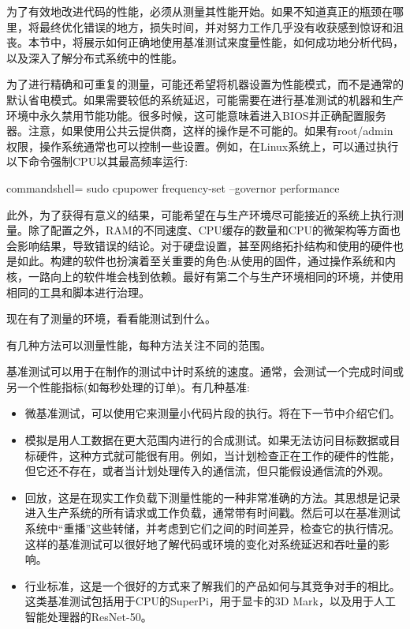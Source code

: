 

为了有效地改进代码的性能，必须从测量其性能开始。如果不知道真正的瓶颈在哪里，将最终优化错误的地方，损失时间，并对努力工作几乎没有收获感到惊讶和沮丧。本节中，将展示如何正确地使用基准测试来度量性能，如何成功地分析代码，以及深入了解分布式系统中的性能。


为了进行精确和可重复的测量，可能还希望将机器设置为性能模式，而不是通常的默认省电模式。如果需要较低的系统延迟，可能需要在进行基准测试的机器和生产环境中永久禁用节能功能。很多时候，这可能意味着进入BIOS并正确配置服务器。注意，如果使用公共云提供商，这样的操作是不可能的。如果有root/admin权限，操作系统通常也可以控制一些设置。例如，在Linux系统上，可以通过执行以下命令强制CPU以其最高频率运行:

\begin{tcblisting}{commandshell={}}
sudo cpupower frequency-set --governor performance
\end{tcblisting}

此外，为了获得有意义的结果，可能希望在与生产环境尽可能接近的系统上执行测量。除了配置之外，RAM的不同速度、CPU缓存的数量和CPU的微架构等方面也会影响结果，导致错误的结论。对于硬盘设置，甚至网络拓扑结构和使用的硬件也是如此。构建的软件也扮演着至关重要的角色:从使用的固件，通过操作系统和内核，一路向上的软件堆会栈到依赖。最好有第二个与生产环境相同的环境，并使用相同的工具和脚本进行治理。

现在有了测量的环境，看看能测试到什么。


有几种方法可以测量性能，每种方法关注不同的范围。

基准测试可以用于在制作的测试中计时系统的速度。通常，会测试一个完成时间或另一个性能指标(如每秒处理的订单)。有几种基准:

\begin{itemize}
\item 
微基准测试，可以使用它来测量小代码片段的执行。将在下一节中介绍它们。

\item 
模拟是用人工数据在更大范围内进行的合成测试。如果无法访问目标数据或目标硬件，这种方式就可能很有用。例如，当计划检查正在工作的硬件的性能，但它还不存在，或者当计划处理传入的通信流，但只能假设通信流的外观。

\item 
回放，这是在现实工作负载下测量性能的一种非常准确的方法。其思想是记录进入生产系统的所有请求或工作负载，通常带有时间戳。然后可以在基准测试系统中“重播”这些转储，并考虑到它们之间的时间差异，检查它的执行情况。这样的基准测试可以很好地了解代码或环境的变化对系统延迟和吞吐量的影响。

\item 
行业标准，这是一个很好的方式来了解我们的产品如何与其竞争对手的相比。这类基准测试包括用于CPU的SuperPi，用于显卡的3D Mark，以及用于人工智能处理器的ResNet-50。
\end{itemize}

